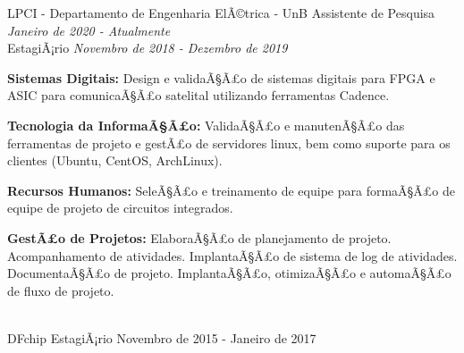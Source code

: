\documentclass[a4paper]{twentysecondcv} %
\begin{document}
\begin{twenty} %
\twentyitem
    	{LPCI - Departamento de Engenharia ElÃ©trica - UnB}
		{Assistente de Pesquisa \hfill \textit{Janeiro de 2020 - Atualmente}\\}
        {EstagiÃ¡rio \hfill\textit{Novembro de 2018 - Dezembro de 2019}}
        {
            \color{pblue}{\hspace{8pt}-\hspace{4pt}} \color{black}\textbf{Sistemas Digitais: }Design e validaÃ§Ã£o de sistemas digitais para FPGA e     ASIC para comunicaÃ§Ã£o satelital utilizando ferramentas Cadence.
            
            \color{pblue}{\hspace{8pt}-\hspace{4pt}} \color{black}\textbf{Tecnologia da InformaÃ§Ã£o: }ValidaÃ§Ã£o e manutenÃ§Ã£o das ferramentas de projeto e gestÃ£o de servidores linux, bem como suporte para os clientes (Ubuntu, CentOS, ArchLinux).
            
            \color{pblue}{\hspace{8pt}-\hspace{4pt}} \color{black}\textbf{Recursos Humanos: }SeleÃ§Ã£o e treinamento de equipe para formaÃ§Ã£o de equipe de projeto de circuitos integrados.
            
            \color{pblue}{\hspace{8pt}-\hspace{4pt}} \color{black}\textbf{GestÃ£o de Projetos: }ElaboraÃ§Ã£o de planejamento de projeto. Acompanhamento de atividades. ImplantaÃ§Ã£o de sistema de log de atividades. DocumentaÃ§Ã£o de projeto. ImplantaÃ§Ã£o, otimizaÃ§Ã£o e automaÃ§Ã£o de fluxo de projeto.
        }
        \\
	\twentyitem
    	{DFchip}
		{EstagiÃ¡rio}
        {Novembro de 2015 - Janeiro de 2017}
        {
            \color{pblue}{\hspace{8pt}-\hspace{4pt}} 
            
            \color{pblue}{\hspace{8pt}-\hspace{4pt}} 
            
}
\end{twenty}
\end{document}
